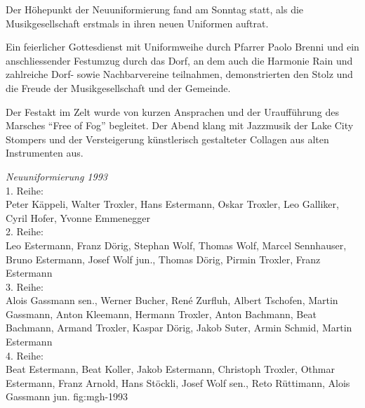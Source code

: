 \begin{history}

    Der Höhepunkt der Neuuniformierung fand am Sonntag statt, als die
    Musikgesellschaft erstmals in ihren neuen Uniformen auftrat.


    Ein feierlicher Gottesdienst mit Uniformweihe durch Pfarrer Paolo Brenni und
    ein anschliessender Festumzug durch das Dorf, an dem auch die Harmonie Rain
    und zahlreiche Dorf- sowie Nachbarvereine teilnahmen, demonstrierten den
    Stolz und die Freude der Musikgesellschaft und der Gemeinde.

    Der Festakt im Zelt wurde von kurzen Ansprachen und der Uraufführung des
    Marsches \enquote{Free of Fog} begleitet. Der Abend klang mit Jazzmusik der
    Lake City Stompers und der Versteigerung künstlerisch gestalteter Collagen
    aus alten Instrumenten aus.

\end{history}


{\emph{Neuuniformierung 1993}\\
    1. Reihe:\\
    Peter Käppeli, Walter Troxler, Hans Estermann, Oskar Troxler, Leo Galliker,
    Cyril Hofer, Yvonne Emmenegger\\
    2. Reihe:\\
    Leo Estermann, Franz Dörig, Stephan Wolf, Thomas Wolf, Marcel Sennhauser,
    Bruno Estermann, Josef Wolf jun., Thomas Dörig, Pirmin Troxler, Franz
    Estermann\\
    3. Reihe:\\
    Alois Gassmann sen., Werner Bucher, René Zurfluh, Albert Tschofen, Martin
    Gassmann, Anton Kleemann, Hermann Troxler, Anton Bachmann, Beat Bachmann,
    Armand Troxler, Kaspar Dörig, Jakob Suter, Armin Schmid, Martin Estermann\\
    4. Reihe:\\
    Beat Estermann, Beat Koller, Jakob Estermann, Christoph Troxler, Othmar
    Estermann, Franz Arnold, Hans Stöckli, Josef Wolf sen., Reto Rüttimann,
    Alois Gassmann jun. } {fig:mgh-1993}

